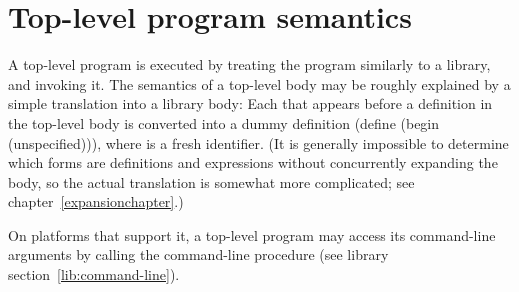 \section{Top-level program semantics}

A top-level program is executed by treating the program similarly to a library, and
invoking it.  The semantics of a top-level body may be roughly explained by
a simple translation into a library body: 
Each  that appears before a
definition in
the top-level body is converted into a dummy definition 
{\cf (define  (begin  (unspecified)))},
where  is a fresh identifier.
(It is generally impossible to determine which forms are 
definitions and expressions without concurrently expanding the body, so
the actual translation is somewhat more complicated; see
chapter~\ref{expansionchapter}.)

On platforms that support it, a top-level program may access its command-line 
arguments by calling the {\cf command-line} procedure (see library 
section~\ref{lib:command-line}).

